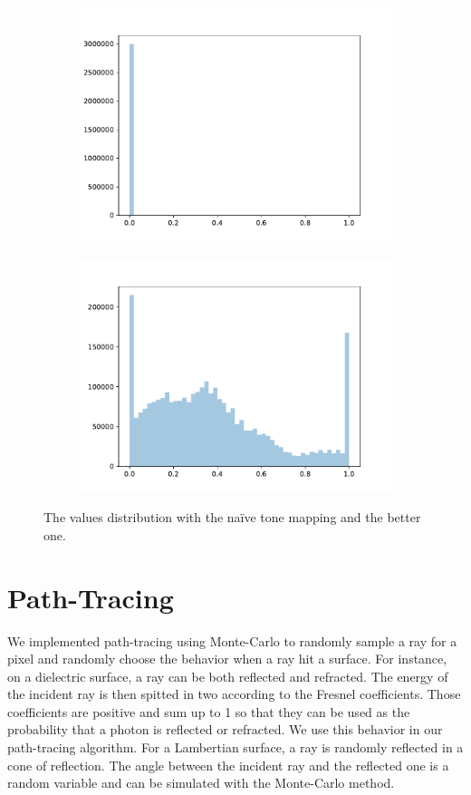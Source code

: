 \documentclass[acmsmall]{acmart}
\begin{document}
\begin{figure}[h]
    \centering
    
\begin{subfigure}{.5\textwidth}
  \centering
  \includegraphics[width=.9\linewidth]{img/withouttone.pdf}
\end{subfigure}%
\begin{subfigure}{.5\textwidth}
  \centering
  \includegraphics[width=.9\linewidth]{img/withtone.pdf}
\end{subfigure} 
    
    \caption{The values distribution with the naïve tone mapping and the better one.}
    \label{fig:disttone}
\end{figure}


\section{Path-Tracing}
We implemented path-tracing using Monte-Carlo to randomly sample a ray for a pixel and randomly choose the behavior when a ray hit a surface.
For instance, on a dielectric surface, a ray can be both reflected and refracted. The energy of the incident ray is then spitted in two according to the Fresnel coefficients.
Those coefficients are positive and sum up to 1 so that they can be used as the probability that a photon is reflected or refracted. We use this behavior in our path-tracing algorithm.
For a Lambertian surface, a ray is randomly reflected in a cone of reflection. The angle between the incident ray and the reflected one is a random variable and can be simulated with the Monte-Carlo method.
\end{document}
